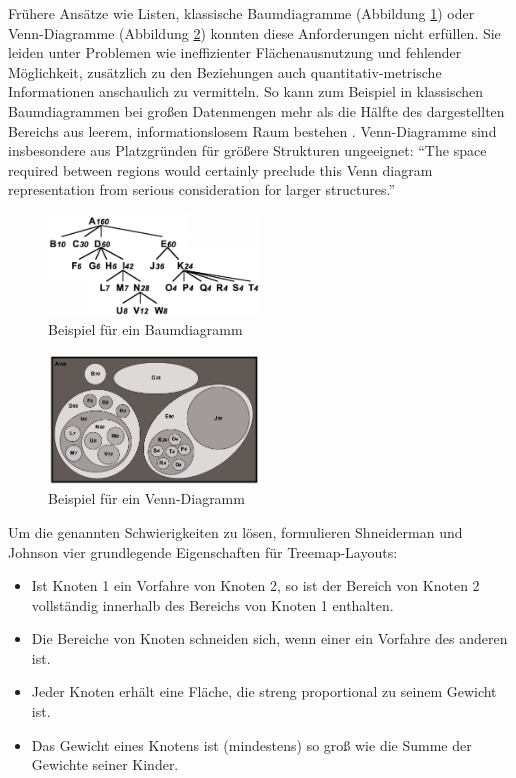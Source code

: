 Frühere Ansätze wie Listen, klassische Baumdiagramme (Abbildung \ref{fig:baumdiagramm}) oder Venn-Diagramme (Abbildung \ref{fig:venndiagram}) konnten diese Anforderungen nicht erfüllen. Sie leiden unter Problemen wie ineffizienter Flächenausnutzung und fehlender Möglichkeit, zusätzlich zu den Beziehungen auch quantitativ-metrische Informationen anschaulich zu vermitteln. So kann zum Beispiel in klassischen Baumdiagrammen bei großen Datenmengen mehr als die Hälfte des dargestellten Bereichs aus leerem, informationslosem Raum bestehen \cite[3]{johnson1991tree}. Venn-Diagramme sind insbesondere aus Platzgründen für größere Strukturen ungeeignet: \enquote{The space required between regions would certainly preclude this Venn diagram representation from serious consideration for larger structures.}\cite[5]{johnson1991tree}

\begin{figure}[ht]
    \centering
    \includegraphics[width=0.5\textwidth]{images/treediagram.png}
    \caption{Beispiel für ein Baumdiagramm}
    \label{fig:baumdiagramm}
\end{figure}

\begin{figure}[ht]
    \centering
    \includegraphics[width=0.5\textwidth]{images/verdiagram.png}
    \caption{Beispiel für ein Venn-Diagramm}
    \label{fig:venndiagram}
\end{figure}

Um die genannten Schwierigkeiten zu lösen, formulieren Shneiderman und Johnson vier grundlegende Eigenschaften für Treemap-Layouts:
\begin{itemize}
    \item Ist Knoten 1 ein Vorfahre von Knoten 2, so ist der Bereich von Knoten 2 vollständig innerhalb des Bereichs von Knoten 1 enthalten.
    \item Die Bereiche von Knoten schneiden sich, wenn einer ein Vorfahre des anderen ist.
    \item Jeder Knoten erhält eine Fläche, die streng proportional zu seinem Gewicht ist.
    \item Das Gewicht eines Knotens ist (mindestens) so groß wie die Summe der Gewichte seiner Kinder.
\end{itemize}

